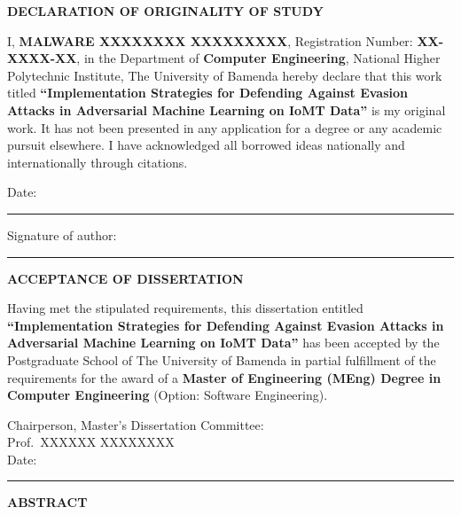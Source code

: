 \documentclass[12pt,a4paper,oneside]{report}
\begin{document}
\thispagestyle{empty}
\begin{center}
    {\Large\bfseries DECLARATION OF ORIGINALITY OF STUDY}
\end{center}
\vspace{1cm}

I, \textbf{MALWARE XXXXXXXX XXXXXXXXX}, Registration Number: \textbf{XX-XXXX-XX}, in the Department of \textbf{Computer Engineering}, National Higher Polytechnic Institute, The University of Bamenda hereby declare that this work titled \textbf{``Implementation Strategies for Defending Against Evasion Attacks in Adversarial Machine Learning on IoMT Data''} is my original work. It has not been presented in any application for a degree or any academic pursuit elsewhere. I have acknowledged all borrowed ideas nationally and internationally through citations.

\vspace{2cm}

\noindent Date:~\rule{5cm}{0.4pt}\hfill Signature of author:~\rule{5cm}{0.4pt}
\vfill
\newpage

\thispagestyle{empty}
\begin{center}
    {\Large\bfseries ACCEPTANCE OF DISSERTATION}
\end{center}
\vspace{1cm}

Having met the stipulated requirements, this dissertation entitled \textbf{``Implementation Strategies for Defending Against Evasion Attacks in Adversarial Machine Learning on IoMT Data''} has been accepted by the Postgraduate School of The University of Bamenda in partial fulfillment of the requirements for the award of a \textbf{Master of Engineering (MEng) Degree in Computer Engineering} (Option: Software Engineering).

\vspace{2cm}

\begin{flushleft}
Chairperson, Master's Dissertation Committee:\hrulefill\\[0.3cm]
Prof.~XXXXXX XXXXXXXX\\[1cm]
Date:~\rule{5cm}{0.4pt}
\end{flushleft}
\vfill
\newpage

\thispagestyle{empty}
\begin{center}
    {\Large\bfseries ABSTRACT}
\end{center}
\vspace{0.5cm}
\end{document}
